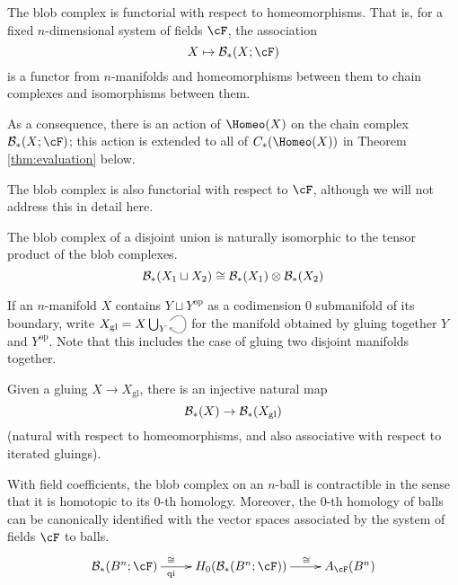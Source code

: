 \begin{property}[Functoriality]
\label{property:functoriality}%
The blob complex is functorial with respect to homeomorphisms.
That is, 
for a fixed $n$-dimensional system of fields $\cF$, the association
\begin{equation*}
X \mapsto \bc_*(X; \cF)
\end{equation*}
is a functor from $n$-manifolds and homeomorphisms between them to chain 
complexes and isomorphisms between them.
\end{property}
As a consequence, there is an action of $\Homeo(X)$ on the chain complex $\bc_*(X; \cF)$; 
this action is extended to all of $C_*(\Homeo(X))$ in Theorem \ref{thm:evaluation} below.

The blob complex is also functorial with respect to $\cF$, 
although we will not address this in detail here.

\begin{property}
\label{property:disjoint-union}
The blob complex of a disjoint union is naturally isomorphic to the tensor product of the blob complexes.
\begin{equation*}
{\mathcal B}_*(X_1 \sqcup X_2) \cong {\mathcal B}_*(X_1) \otimes {\mathcal B}_*(X_2)
\end{equation*}
\end{property}

If an $n$-manifold $X$ contains $Y \sqcup Y^\text{op}$ as a codimension $0$ submanifold of its boundary, 
write $X_\text{gl} = X \bigcup_{Y}\selfarrow$ for the manifold obtained by gluing together $Y$ and $Y^\text{op}$.
Note that this includes the case of gluing two disjoint manifolds together.
\begin{property}
\label{property:gluing-map}%
Given a gluing $X \to X_\mathrm{gl}$, there is an injective natural map
\[
	{\mathcal B}_*(X) \to {\mathcal B}_*(X_\mathrm{gl}) 
\]
(natural with respect to homeomorphisms, and also associative with respect to iterated gluings).
\end{property}

\begin{property}[Contractibility]
\label{property:contractibility}%
With field coefficients, the blob complex on an $n$-ball is contractible in the sense 
that it is homotopic to its $0$-th homology.
Moreover, the $0$-th homology of balls can be canonically identified with the vector spaces 
associated by the system of fields $\cF$ to balls.
\begin{equation*}
\xymatrix{\bc_*(B^n;\cF) \ar[r]^(0.4){\iso}_(0.4){\text{qi}} & H_0(\bc_*(B^n;\cF)) \ar[r]^(0.6)\iso & A_\cF(B^n)}
\end{equation*}
\end{property}

